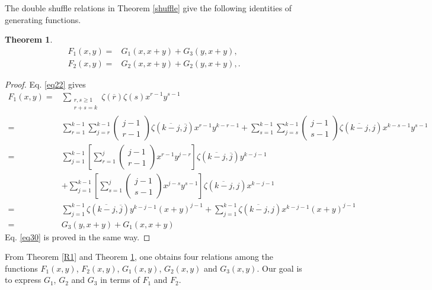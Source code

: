 \documentclass[reqno]{amsart}
\newtheorem{theorem}{Theorem}[section]
\theoremstyle{definition}
\theoremstyle{remark}
\numberwithin{equation}{section}
\begin{document}
The double shuffle relations in Theorem \ref{shuffle} give the following identities of generating functions.
\begin{theorem}\label{R2}
\begin{align}
F_1(x,y)=&G_1(x,x+y)+G_3(y, x+y),\label{eq29}\\
F_2(x,y)=&G_2(x,x+y)+G_2(y, x+y),\label{eq30}.
\end{align}
\end{theorem}
\begin{proof}
Eq. \eqref{eq22} gives
\begin{align*}
F_1(x,y)=&\sum_{\substack{r,s\geq 1\\r+s=k}}\zeta(\overline{r})\zeta(s)x^{r-1}y^{s-1}\\
=&\sum_{r=1}^{k-1}\sum_{j=r}^{k-1} \begin{pmatrix}j-1\\r-1\end{pmatrix} \zeta(\overline{k-j}, \overline{j})x^{r-1}y^{k-r-1}+\sum_{s=1}^{k-1}\sum_{j=s}^{k-1} \begin{pmatrix}j-1\\s-1\end{pmatrix} \zeta(\overline{k-j}, j)x^{k-s-1}y^{s-1}\\
=&\sum_{j=1}^{k-1}\left[\sum_{r=1}^j\begin{pmatrix}j-1\\r-1\end{pmatrix}x^{r-1}y^{j-r}\right]\zeta(\overline{k-j}, \overline{j})y^{k-j-1}
\\&+\sum_{j=1}^{k-1}\left[\sum_{s=1}^j\begin{pmatrix}j-1\\s-1\end{pmatrix}x^{j-s}y^{s-1}\right]\zeta(\overline{k-j}, j)x^{k-j-1}\\
=&\sum_{j=1}^{k-1}\zeta(\overline{k-j}, \overline{j})y^{k-j-1}(x+y)^{j-1}+\sum_{j=1}^{k-1}\zeta(\overline{k-j}, j)x^{k-j-1}(x+y)^{j-1}\\
=&G_3(y, x+y)+G_1(x, x+y)
\end{align*}
Eq. \eqref{eq30} is proved in the same way.
\end{proof}
From Theorem \ref{R1} and Theorem \ref{R2}, one obtains four relations among the functions $F_1(x, y)$, $F_2(x, y)$, $G_1(x, y)$, $G_2(x, y)$ and $G_3(x, y)$. Our goal is to express $G_1$, $G_2$ and $G_3$ in terms of $F_1$ and $F_2$.
\end{document}
